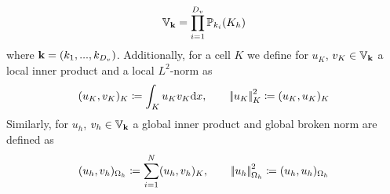 \begin{equation}
	\mathbb{V}_{\textbf{k}} = \prod_{i=1}^{D_v} \mathbb{P}_{k_i}(K_h)
	\label{Eq:Vspace}
\end{equation}
where $\textbf{k} = \left(k_1,...,k_{D_v}\right)$. 
Additionally, for a cell $K$ we define for $u_K$, $v_K\in \mathbb{V}_{\textbf{k}}$ a local inner product and a local $L^2$-norm as
\begin{equation}
(u_K, v_K)_K \coloneqq \int_K u_K v_K\text{d}x, \qquad \left|\!\left| {u_K} \right|\!\right|^2_K \coloneqq(u_K,u_K)_K
\end{equation}
Similarly, for $u_h$, $v_h \in \mathbb{V}_{\textbf{k}}$ a global inner product and global broken norm are defined as
\begin{equation}
	(u_h, v_h)_{\Omega_h} \coloneqq \sum_{i = 1}^N (u_h, v_h)_K, \qquad \left|\!\left| {u_h} \right|\!\right|^2_{\Omega_h} \coloneqq(u_h,u_h)_{\Omega_h}
\end{equation}
